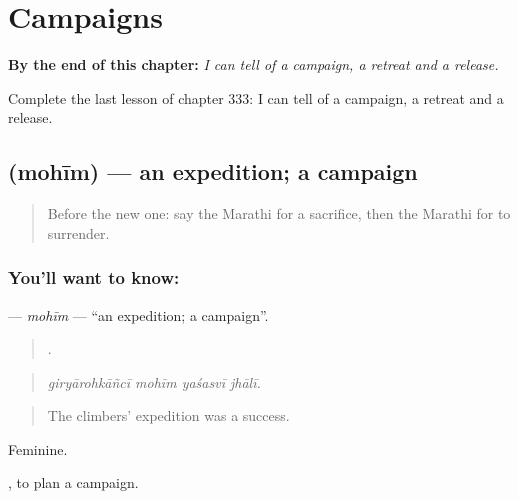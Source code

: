 
\chapter{Campaigns}
\label{ch:mr-campaigns}

\begin{chapteropening}
\textbf{By the end of this chapter:} \emph{I can tell of a campaign, a retreat and a release.}

Complete the last lesson of chapter 333: I can tell of a campaign, a retreat and a release.
\end{chapteropening}

\section[\texorpdfstring{\mr{मोहीम} (mohīm)}{मोहीम (mohīm)}]{ (mohīm) — an expedition; a campaign}

\label{lesson:MR-C333-mohim}



\begin{quote}
Before the new one: say the Marathi for a sacrifice, then the Marathi for to surrender.
\end{quote}

\subsection*{You'll want to know: }
\textbf{} — \emph{mohīm} — \textquotedblleft{}an expedition; a campaign\textquotedblright{}.

\begin{quote}
   .
\end{quote}

\begin{quote}
\emph{giryārohkāñcī mohīm yaśasvī jhālī.}
\end{quote}

\begin{quote}
The climbers' expedition was a success.
\end{quote}

Feminine.

 , to plan a campaign.

